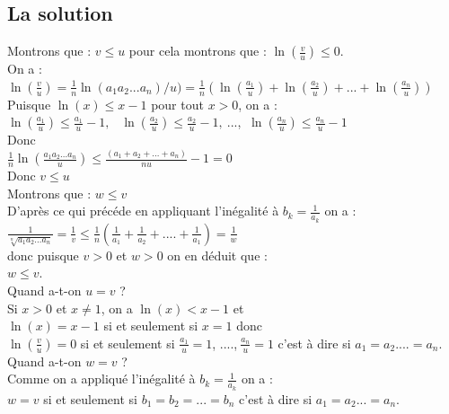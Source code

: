 \documentclass[a4paper,11pt]{book}
\begin{document}
\subsection{La solution}
Montrons que : $v\leq u$
pour cela montrons que : $\displaystyle\ln(\frac{v}{u})\leq 0$.\\
On a :\\
$\displaystyle\ln(\frac{v}{u})=\frac{1}{n}\ln(a_1a_2...a_n)/u)=
\frac{1}{n}(\ln(\frac{a_1}{u})+\ln(\frac{a_2}{u})+...+\ln(\frac{a_n}{u}))$\\
Puisque $\ln(x)\leq x-1$ pour tout $x>0$, on a :\\
$\displaystyle\ln(\frac{a_1}{u})\leq \frac{a_1}{u}-1,\ $
$\ \displaystyle\ln(\frac{a_2}{u})\leq \frac{a_2}{u}-1,\ $...,
$\ \displaystyle\ln(\frac{a_n}{u})\leq \frac{a_n}{u}-1$\\
Donc\\
$\displaystyle\frac{1}{n}\ln(\frac{a_1a_2...a_n}{u}) \leq \frac{(a_1+a_2+...+a_n)}{nu}-1=0$\\
Donc 
$v\leq u$\\
Montrons que : $w\leq v$\\
D'apr\`es ce qui pr\'ec\'ede en appliquant l'in\'egalit\'e \`a 
$\displaystyle b_k=\frac{1}{a_k}$ on a :\\
$\displaystyle\frac{1}{\sqrt[n]{a_1a_2...a_n}}=\frac{1}{v}\leq \frac{1}{n}(\frac{1}{a_1}+\frac{1}{a_2}+....+\frac{1}{a_1})=\frac{1}{w}$\\
donc puisque $v>0$ et $w>0$ on en d\'eduit que :\\
$w\leq v$.\\
Quand a-t-on $u=v$ ?\\
Si  $x>0$ et $x\neq 1$, on a $\ln(x)< x-1$  et\\
$\ln(x)= x-1$ si et seulement si $x=1$ donc\\
$\displaystyle\ln(\frac{v}{u})=0$ si et seulement si $\displaystyle\frac{a_1}{u}=1$, ....,$\ \displaystyle\frac{a_n}{u}=1$
c'est \`a dire si $a_1=a_2....=a_n$.\\
Quand a-t-on $w=v$ ?\\
Comme on a appliqu\'e l'in\'egalit\'e \`a 
$\displaystyle b_k=\frac{1}{a_k}$ on a :\\
$w=v$ si et seulement si $b_1=b_2=...=b_n$ c'est \`a dire si $a_1=a_2...=a_n$.
\end{document}
